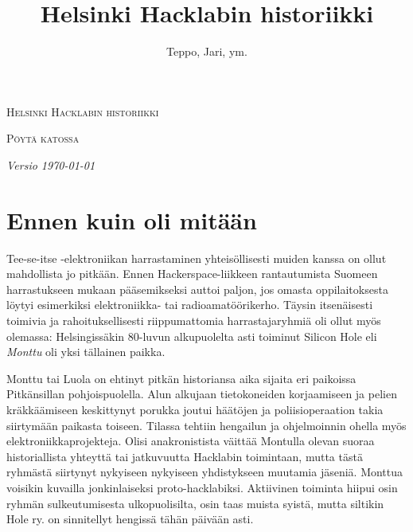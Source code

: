 \documentclass[a4paper]{memoir}
\title{Helsinki Hacklabin historiikki}
\author{Teppo, Jari, ym.}
\newlength{\distance}
\begin{document}


\setsansfont{Tahoma}
 





{\centering
	{\scshape\LARGE Helsinki Hacklabin historiikki \par}
	\vspace{0.5cm}
	{\scshape\Large Pöytä katossa \par}
	\vspace{1cm}
	{\itshape Versio \today\par}
}
\vspace{3cm}


\section*{Ennen kuin oli mitään}

Tee-se-itse -elektroniikan harrastaminen yhteisöllisesti muiden kanssa on ollut mahdollista jo pitkään. Ennen Hackerspace-liikkeen rantautumista Suomeen harrastukseen mukaan pääsemikseksi auttoi paljon, jos omasta oppilaitoksesta löytyi esimerkiksi elektroniikka- tai radioamatöörikerho. Täysin itsenäisesti toimivia ja rahoituksellisesti riippumattomia harrastajaryhmiä oli ollut myös olemassa: Helsingissäkin 80-luvun alkupuolelta asti toiminut Silicon Hole eli \textit{Monttu} oli yksi tällainen paikka.

Monttu tai Luola on ehtinyt pitkän historiansa aika sijaita eri paikoissa Pitkänsillan pohjoispuolella. Alun alkujaan tietokoneiden korjaamiseen ja pelien kräkkäämiseen keskittynyt porukka joutui häätöjen ja poliisioperaation takia siirtymään paikasta toiseen. Tilassa tehtiin hengailun ja ohjelmoinnin ohella myös elektroniikkaprojekteja. Olisi anakronistista väittää Montulla olevan suoraa historiallista yhteyttä tai jatkuvuutta Hacklabin toimintaan, mutta tästä ryhmästä siirtynyt nykyiseen nykyiseen yhdistykseen muutamia jäseniä. Monttua voisikin kuvailla jonkinlaiseksi proto-hacklabiksi. Aktiivinen toiminta hiipui osin ryhmän sulkeutumisesta ulkopuolisilta, osin taas muista syistä, mutta siltikin Hole ry. on sinnitellyt hengissä tähän päivään asti.
\end{document}

